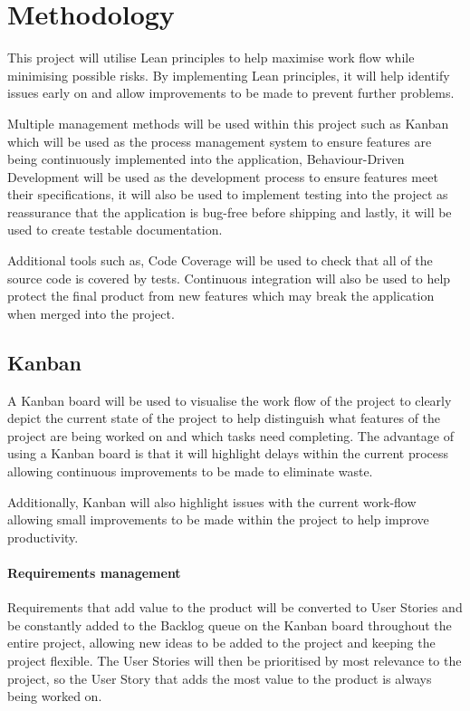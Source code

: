 \chapter{Methodology}
This project will utilise Lean principles to help maximise work flow while minimising possible risks. By implementing Lean principles, it will help identify issues early on and allow improvements to be made to prevent further problems.

Multiple management methods will be used within this project such as Kanban which will be used as the process management system to ensure features are being continuously implemented into the application, Behaviour-Driven Development will be used as the development process to ensure features meet their specifications, it will also be used to implement testing into the project as reassurance that the application is bug-free before shipping and lastly, it will be used to create testable documentation. 

Additional tools such as, Code Coverage will be used to check that all of the source code is covered by tests. Continuous integration will also be used to help protect the final product from new features which may break the application when merged into the project.


\section{Kanban}
A Kanban board will be used to visualise the work flow of the project to clearly depict the current state of the project to help distinguish what features of the project are being worked on and which tasks need completing. The advantage of using a Kanban board is that it will highlight delays within the current process allowing continuous improvements to be made to eliminate waste.

Additionally, Kanban will also highlight issues with the current work-flow allowing small improvements to be made within the project to help improve productivity.

\subsubsection{Requirements management}
Requirements that add value to the product will be converted to User Stories and be constantly added to the Backlog queue on the Kanban board throughout the entire project, allowing new ideas to be added to the project and keeping the project flexible. The User Stories will then be prioritised by most relevance to the project, so the User Story that adds the most value to the product is always being worked on.

